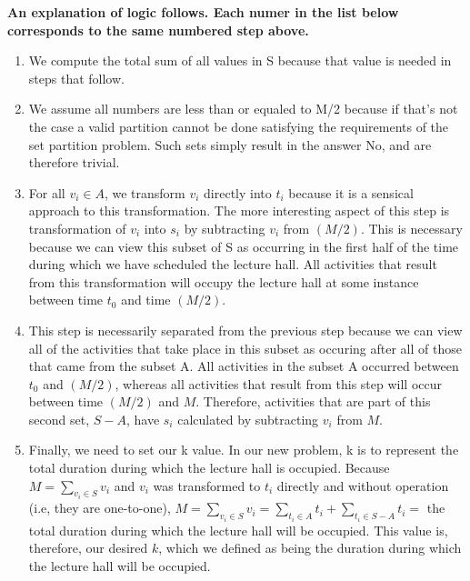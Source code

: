 \documentclass{article}
\begin{document}
\textbf{An explanation of logic follows. Each numer in the list below corresponds to the same numbered
step above.}
\begin{enumerate}
    \item We compute the total sum of all values in S because that value is needed in steps that follow.
    \item We assume all numbers are less than or equaled to M/2 because if that's not the case a valid
    partition cannot be done satisfying the requirements of the set partition problem. Such sets simply
    result in the answer No, and are therefore trivial.
    \item For all \(v_i \in A\), we transform \(v_i\) directly into \(t_i\) because it is a sensical
    approach to this transformation. The more interesting aspect of this step is transformation of
    \(v_i\) into \(s_i\) by subtracting \(v_i\) from \((M/2)\). This is necessary because we can view
    this subset of S as occurring in the first half of the time during which we have scheduled the 
    lecture hall. All activities that result from this transformation will occupy the lecture hall at
    some instance between time \(t_0\) and time \((M/2)\).
    \item This step is necessarily separated from the previous step because we can view all of the
    activities that take place in this subset as occuring after all of those that came from the 
    subset A. All activities in the subset A occurred between \(t_0\) and \((M/2)\), whereas all
    activities that result from this step will occur between time \((M/2)\) and \(M\). Therefore,
    activities that are part of this second set, \(S - A\), have \(s_i\) calculated by subtracting
    \(v_i\) from \(M\).
    \item Finally, we need to set our k value. In our new problem, k is to represent the total
    duration during which the lecture hall is occupied. Because \(M = \sum_{v_i \in S}{v_i}\) and
    \(v_i\) was transformed to \(t_i\) directly and without operation (i.e, they are one-to-one),
    \(M = \sum_{v_i \in S}{v_i} = \sum_{t_i \in A}{t_i} + \sum_{t_i \in S-A}{t_i} = \) the total
    duration during which the lecture hall will be occupied. This value is, therefore, our desired
    \(k\), which we defined as being the duration during which the lecture hall will be occupied.
\end{enumerate}
\end{document}
